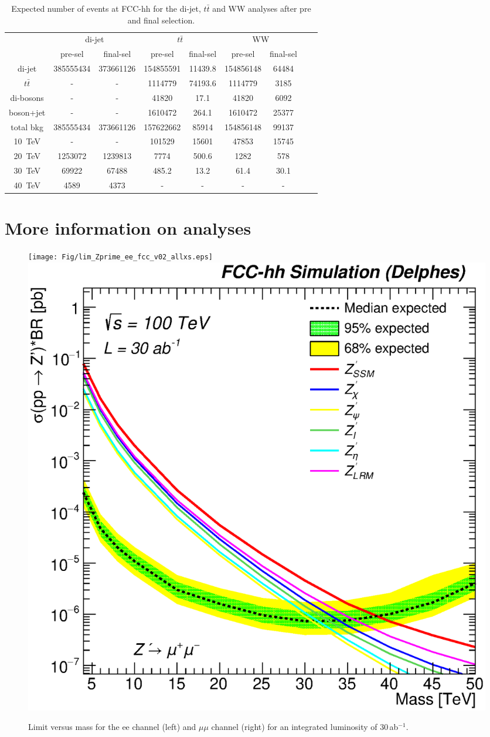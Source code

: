 \documentclass[a4paper,11pt]{article}
\newcommand*{\ttbar}{\ensuremath{t\bar{t}}}
\begin{document}
\begin{table}[htbp]
   \centering
\begin{tabular}{|c|c|c|c|c|c|c|c|c|}
  \hline
  \hline
  & \multicolumn{2}{c|}{di-jet}  & \multicolumn{2}{c|}{$\ttbar$} & \multicolumn{2}{c|}{WW} \\
  \cline{2-7}

 & pre-sel & final-sel  & pre-sel & final-sel & pre-sel & final-sel\\
  \hline
  di-jet & 385555434 &  373661126 &  154855591 & 11439.8&  154856148 & 64484\\
  $\ttbar$ & - & - & 1114779 & 74193.6 &  1114779 & 3185\\
  di-bosons & - & - &  41820 &  17.1 &  41820 & 6092\\
  boson+jet & - & - & 1610472 & 264.1&  1610472 & 25377\\
  \hline
  total bkg  &  385555434& 373661126& 157622662 & 85914 & 154856148 & 99137\\
  \hline
  10~TeV &  - & - &  101529 & 15601 &  47853 & 15745\\
  20~TeV &   1253072 &  1239813& 7774 & 500.6 & 1282 & 578\\
  30~TeV &  69922 &  67488 & 485.2 & 13.2 &  61.4 & 30.1 \\
  40~TeV &  4589 &  4373 & - & - & - & -\\
  \hline
  \hline
\end{tabular}
  \caption{Expected number of events at FCC-hh for the di-jet, $\ttbar$ and WW analyses after pre and final selection.}
  \label{tab:hadronicresonances:yields}
\end{table}


\section{More information on analyses}
\label{app:anamore}
\begin{figure}[!htb]
  \centering
  \texttt{[image: Fig/lim\_Zprime\_ee\_fcc\_v02\_allxs.eps]}
  \includegraphics[width=0.35\columnwidth]{Fig/lim_Zprime_mumu_fcc_v02_allxs.eps}
  \caption{Limit versus mass for the ee channel (left) and $\mu\mu$ channel (right) for an integrated luminosity of $30$\,ab$^{-1}$. }
  \label{figure:leptonicresonances:resultseemumu}
\end{figure}
\end{document}

